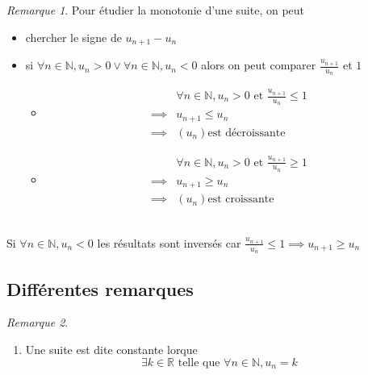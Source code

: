 \documentclass{article}
\newcommand{\R}{\mathbb{R}}
\newcommand{\N}{\mathbb{N}}
\newcommand{\allent}{\forall n \in \N}
\newcommand{\et}{\text{ et }}
\newcommand{\tq}{\text{ telle que }}
\newenvironment{att}
{\bgroup \color{red}{\Large\textbf{Attention}}\\}
{\egroup}
\theoremstyle{definition}
\theoremstyle{remark}
\newtheorem*{rem}{Remarque}
\theoremstyle{plain}
\begin{document}
\begin{rem}
Pour étudier la monotonie d'une suite, on peut 
\begin{itemize}
    \item chercher le signe de $u_{n + 1} - u_n$
    \item si $\allent, u_n > 0 \vee \allent, u_n < 0$ alors on peut
    comparer $\frac{u_{n + 1}}{u_n}$ et $1$
    \begin{itemize}
        \item 
        \begin{align*}
                    &\allent, u_n > 0 \et \frac{u_{n + 1}}{u_n} \leq 1 \\
            \implies& u_{n + 1} \leq u_n \\
            \implies& (u_n) \text{est décroissante}
        \end{align*}
        \item 
        \begin{align*}
                    &\allent, u_n > 0 \et \frac{u_{n + 1}}{u_n} \geq 1 \\
            \implies& u_{n + 1} \geq u_n \\
            \implies& (u_n) \text{est croissante}
        \end{align*}
    \end{itemize}
\end{itemize}
\begin{att}
Si $\allent, u_n < 0$ les résultats sont inversés car
$\frac{u_{n + 1}}{u_n} \leq 1 \implies u_{n + 1} \geq u_n$
\end{att}
\end{rem}

\subsection{Différentes remarques}
\begin{rem}
\quad
\begin{enumerate}
    \item Une suite est dite constante lorque
    \[
        \exists k \in \R \tq \allent, u_n = k
    \]
\end{enumerate}
\end{rem}
\end{document}
